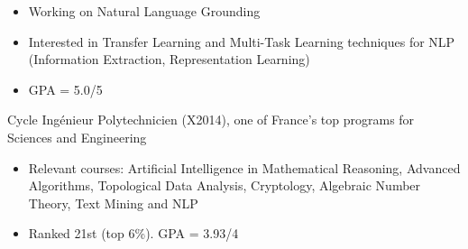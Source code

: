 \documentclass[10pt,a4paper]{altacv}
\begin{document}


\begin{fullwidth}
\makecvheader
\end{fullwidth}


\begin{itemize}
\item Working on Natural Language Grounding
\item Interested in Transfer Learning and Multi-Task Learning techniques for NLP (Information Extraction, Representation Learning)
\item GPA = 5.0/5
\end{itemize}

\divider

Cycle Ingénieur Polytechnicien (X2014), one of France’s top programs for Sciences and Engineering
\begin{itemize}
\item Relevant courses: Artificial Intelligence in Mathematical Reasoning, Advanced Algorithms, Topological
Data Analysis, Cryptology, Algebraic Number Theory, Text Mining and NLP
\item Ranked 21st (top 6\%). GPA = 3.93/4
\end{itemize}
\end{document}
